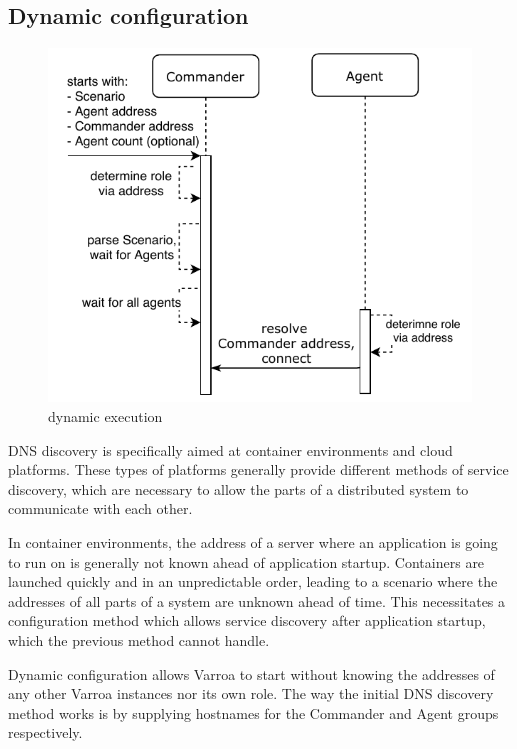 \subsection{Dynamic configuration}

\begin{figure}[h]
\begin{center}
\includegraphics[scale=1]{Resources/PDF/ExecutionDnsInit}
\caption{dynamic execution}
\label{pic:dynamicExecution}
\end{center}
\end{figure}

DNS discovery is specifically aimed at container environments and cloud platforms. These types of platforms generally provide different methods of service discovery, which are necessary to allow the parts of a distributed system to communicate with each other.

In container environments, the address of a server where an application is going to run on is generally not known ahead of application startup. Containers are launched quickly and in an unpredictable order, leading to a scenario where the addresses of all parts of a system are unknown ahead of time. This necessitates a configuration method which allows service discovery after application startup, which the previous method cannot handle.


Dynamic configuration allows Varroa to start without knowing the addresses of any other Varroa instances nor its own role. The way the initial DNS discovery method works is by supplying hostnames for the Commander and Agent groups respectively.


